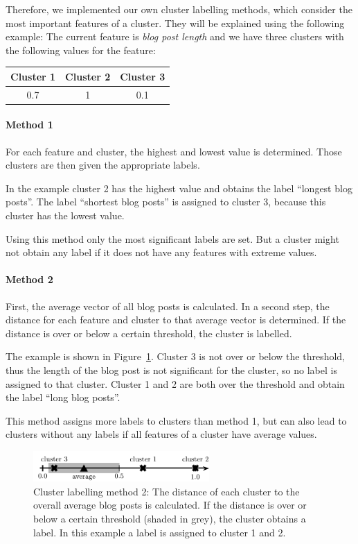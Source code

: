 Therefore, we implemented our own cluster labelling methods, which consider the most important features of a cluster.
They will be explained using the following example:
The current feature is \textit{blog post length} and we have three clusters with the following values for the feature:
\begin{center}
\begin{tabular}{c|c|c}
  Cluster 1 & Cluster 2 & Cluster 3 \\ \hline
  0.7 & 1 & 0.1 \\
 \end{tabular}
\end{center}


\paragraph{Method 1}
For each feature and cluster, the highest and lowest value is determined.
Those clusters are then given the appropriate labels.

In the example cluster 2 has the highest value and obtains the label ``longest blog posts''.
The label ``shortest blog posts'' is assigned to cluster 3, because this cluster has the lowest value.

Using this method only the most significant labels are set.
But a cluster might not obtain any label if it does not have any features with extreme values.


\paragraph{Method 2}
First, the average vector of all blog posts is calculated.
In a second step, the distance for each feature and cluster to that average vector is determined.
If the distance is over or below a certain threshold, the cluster is labelled.

The example is shown in Figure~\ref{fig:cluster_labeling_2}.
Cluster 3 is not over or below the threshold, thus the length of the blog post is not significant for the cluster, so no label is assigned to that cluster.
Cluster 1 and 2 are both over the threshold and obtain the label ``long blog posts''.

This method assigns more labels to clusters than method 1, but can also lead to clusters without any labels if all features of a cluster have average values.

\begin{figure}[ht!]
	\centering
	\includegraphics[width=0.6\textwidth]{images/cluster_labeling_2.pdf}
	\caption{Cluster labelling method 2: The distance of each cluster to the overall average blog posts is calculated. If the distance is over or below a certain threshold (shaded in grey), the cluster obtains a label. In this example a label is assigned to cluster 1 and 2.}
	\label{fig:cluster_labeling_2}
\end{figure}


